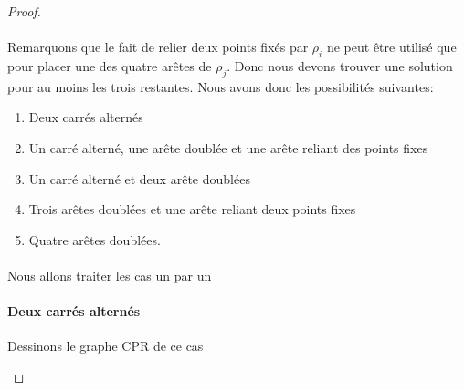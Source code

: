 \begin{proof}
  \paragraph{}
  Remarquons que le fait de relier deux points fixés par $\rho_i$ ne peut être utilisé que pour placer une des quatre arêtes de $\rho_j$. Donc nous devons trouver une solution pour au moins les trois restantes. Nous avons donc les possibilités suivantes:
  \begin{enumerate}
    \item Deux carrés alternés
    \item Un carré alterné, une arête doublée et une arête reliant des points fixes
    \item Un carré alterné et deux arête doublées
    \item Trois arêtes doublées et une arête reliant deux points fixes
    \item Quatre arêtes doublées.
  \end{enumerate}

  \paragraph{}
  Nous allons traiter les cas un par un

  \paragraph{Deux carrés alternés}
  Dessinons le graphe CPR de ce cas

  \begin{figure}[H]
    \begin{center}
\end{center}
\end{figure}
\end{proof}
